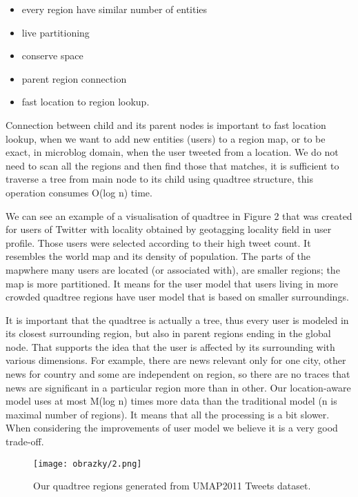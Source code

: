 \documentclass[a4, conference]{IEEEtran}
\begin{document}
\begin{itemize}
\item every region have similar number of entities
\item live partitioning
\item conserve space
\item parent region connection
\item fast location to region lookup.
\end{itemize}

Connection   between   child   and   its   parent   nodes   is important to fast location lookup, when  we want to add new entities (users) to a region map, or to be exact, in microblog domain,  when  the  user  tweeted  from  a  location.  We  do  not need to scan all the regions and then find those that matches, it  is  sufficient  to  traverse  a  tree  from  main  node to  its  child using  quadtree structure,  this  operation  consumes  O(log  n) time. 

We  can  see  an  example  of  a  visualisation  of  quadtree  in Figure  2  that  was  created  for  users  of  Twitter  with  locality obtained  by  geotagging  locality  field  in  user  profile.  Those users  were  selected  according  to  their  high  tweet  count.  It resembles  the  world  map  and  its  density  of  population.  The parts of the mapwhere many users are located (or associated with),  are  smaller  regions;  the  map  is  more  partitioned.  It means  for  the  user  model  that  users  living  in  more crowded quadtree  regions  have  user  model  that  is  based  on  smaller surroundings.

 It  is  important  that  the  quadtree  is  actually  a  tree,  thus every  user  is  modeled  in  its  closest  surrounding  region,  but also  in parent  regions  ending  in  the  global  node.  That supports  the  idea  that  the  user  is  affected  by  its surrounding with   various   dimensions.   For   example,   there   are   news relevant  only  for  one  city,  other  news  for  country and  some are  independent  on  region,  so  there  are  no  traces  that  news are significant in a particular region more than in other. Our  location-aware model  uses  at  most  M(log n)  times more  data  than  the  traditional  model  (n  is  maximal  number of  regions).  It  means  that  all  the  processing  is  a bit  slower. When   considering   the  improvements   of   user   model   we believe it is a very good trade-off. 

\begin{figure}[h!]
\texttt{[image: obrazky/2.png]}
\caption{Our quadtree regions generated from UMAP2011 Tweets dataset.}
\end{figure}
\end{document}
